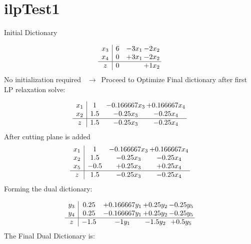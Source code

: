 \documentclass[11pt]{article}
\begin{document}
\section{ilpTest1}

Initial Dictionary 

\[\begin{array}{c| c c@{\hskip 2pt} c@{\hskip 2pt} }
 x_{3}   &  6 & -3 x_{1} & -2 x_{2}\\
 x_{4}   &  0 & + 3 x_{1} & -2 x_{2}\\
\hline
z    &  0  &   & + 1 x_{2}\\
\end{array}\]
No initialization required \ $\rightarrow$\  Proceed to Optimize 
Final dictionary after first LP relaxation solve: 

\[\begin{array}{c| c c@{\hskip 2pt} c@{\hskip 2pt} }
 x_{1}   &  1 & -0.166667 x_{3} & + 0.166667 x_{4}\\
 x_{2}   &  1.5 & -0.25 x_{3} & -0.25 x_{4}\\
\hline
z    &  1.5 & -0.25 x_{3} & -0.25 x_{4}\\
\end{array}\]
 After cutting plane is added 
\[\begin{array}{c| c c@{\hskip 2pt} c@{\hskip 2pt} }
 x_{1}   &  1 & -0.166667 x_{3} & + 0.166667 x_{4}\\
 x_{2}   &  1.5 & -0.25 x_{3} & -0.25 x_{4}\\
 x_{5}   &  -0.5 & + 0.25 x_{3} & + 0.25 x_{4}\\
\hline
z    &  1.5 & -0.25 x_{3} & -0.25 x_{4}\\
\end{array}\]
Forming the dual dictionary:

\[\begin{array}{c| c c@{\hskip 2pt} c@{\hskip 2pt} c@{\hskip 2pt} }
 y_{3}   &  0.25 & + 0.166667 y_{1} & + 0.25 y_{2} & -0.25 y_{5}\\
 y_{4}   &  0.25 & -0.166667 y_{1} & + 0.25 y_{2} & -0.25 y_{5}\\
\hline
z    &  -1.5 & -1 y_{1} & -1.5 y_{2} & + 0.5 y_{5}\\
\end{array}\]
The Final Dual Dictionary is: 
\end{document}
